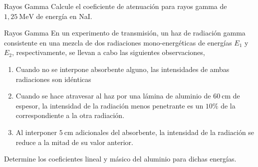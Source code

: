 \begin{Ejercicio}{Rayos Gamma}
Calcule el coeficiente de atenuación para rayos gamma de $1,25\ \text{MeV}$ de energía en NaI.
\end{Ejercicio}


\begin{Ejercicio}{Rayos Gamma}
En un experimento de transmisión, un haz de radiación gamma consistente en una mezcla de dos radiaciones mono-energéticas de energías $E_{1}$ y $E_{2}$, respectivamente, se llevan a cabo las siguientes observaciones,

\begin{enumerate}[label=\alph*)]
\item Cuando no se interpone absorbente alguno, las intensidades de ambas radiaciones son idénticas
\item Cuando se hace atravesar al haz por una lámina de aluminio de $60\ \text{cm}$ de espesor, la intensidad de la radiación menos penetrante es un $10\%$ de la correspondiente a la otra radiación.
\item Al interponer $5\ \text{cm}$ adicionales del absorbente, la intensidad de la radiación se reduce a la mitad de su valor anterior.
\end{enumerate}

Determine los coeficientes lineal y másico del aluminio para dichas energías.
\end{Ejercicio}


